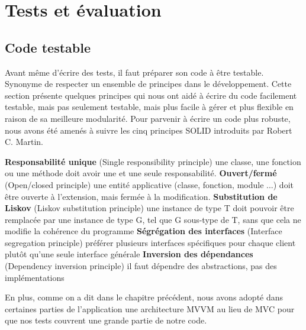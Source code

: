 \chapter{Tests et évaluation}

\section{Code testable} %
\label{sub:code_testable}
Avant même d'écrire des tests, il faut préparer son code à être testable. Synonyme de respecter un ensemble de principes dans le développement.\newline
Cette section présente quelques principes qui nous ont aidé à écrire du code facilement testable, mais pas seulement testable, mais plus facile à gérer et plus flexible en raison de sa meilleure modularité.\newline
Pour parvenir à écrire un code plus robuste, nous avons été amenés à suivre les cinq principes SOLID \cite{solid}introduits par Robert C. Martin.\cite{martin2002agile}
\begin{itemize}
	\itemb \textbf{Responsabilité unique} (Single responsibility principle)
	une classe, une fonction ou une méthode doit avoir une et une seule responsabilité.
	\itemb \textbf{Ouvert/fermé} (Open/closed principle)
	une entité applicative (classe, fonction, module ...) doit être ouverte à l'extension, mais fermée à la modification.
	\itemb \textbf{Substitution de Liskov} (Liskov substitution principle)
	une instance de type T doit pouvoir être remplacée par une instance de type G, tel que G sous-type de T,
	sans que cela ne modifie la cohérence du programme
	\itemb \textbf{Ségrégation des interfaces} (Interface segregation principle)
	préférer plusieurs interfaces spécifiques pour chaque client plutôt qu'une seule interface générale
	\itemb \textbf{Inversion des dépendances} (Dependency inversion principle)
	il faut dépendre des abstractions, pas des implémentations
\end{itemize}
En plus, comme on a dit dans le chapitre précédent, nous avons adopté dans certaines parties de l'application une architecture MVVM au lieu de MVC pour que nos tests couvrent une grande partie de notre code.

